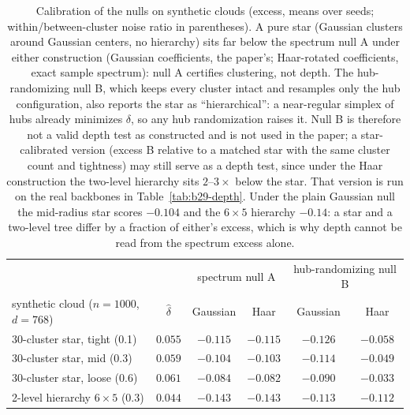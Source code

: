 \begin{table}[H]
\centering
\small
\setlength{\tabcolsep}{4pt}
\begin{tabular}{lc|cc|cc}
\toprule
& & \multicolumn{2}{c|}{spectrum null A} & \multicolumn{2}{c}{hub-randomizing null B} \\
synthetic cloud ($n{=}1000$, $d{=}768$) & $\hat\delta$ & Gaussian & Haar & Gaussian & Haar \\
\midrule
30-cluster star, tight (0.1) & $0.055$ & $-0.115$ & $-0.115$ & $-0.126$ & $-0.058$ \\
30-cluster star, mid (0.3) & $0.059$ & $-0.104$ & $-0.103$ & $-0.114$ & $-0.049$ \\
30-cluster star, loose (0.6) & $0.061$ & $-0.084$ & $-0.082$ & $-0.090$ & $-0.033$ \\
2-level hierarchy $6\times5$ (0.3) & $0.044$ & $-0.143$ & $-0.143$ & $-0.113$ & $-0.112$ \\
\bottomrule
\end{tabular}
\caption{Calibration of the nulls on synthetic clouds (excess, means over seeds; within/between-cluster noise ratio in parentheses). A pure star (Gaussian clusters around Gaussian centers, no hierarchy) sits far below the spectrum null A under either construction (Gaussian coefficients, the paper's; Haar-rotated coefficients, exact sample spectrum): null A certifies clustering, not depth. The hub-randomizing null B, which keeps every cluster intact and resamples only the hub configuration, also reports the star as ``hierarchical'': a near-regular simplex of hubs already minimizes $\delta$, so any hub randomization raises it. Null B is therefore not a valid depth test as constructed and is not used in the paper; a star-calibrated version (excess B relative to a matched star with the same cluster count and tightness) may still serve as a depth test, since under the Haar construction the two-level hierarchy sits $2$--$3\times$ below the star. That version is run on the real backbones in Table~\ref{tab:b29-depth}. Under the plain Gaussian null the mid-radius star scores $-0.104$ and the $6{\times}5$ hierarchy $-0.14$: a star and a two-level tree differ by a fraction of either's excess, which is why depth cannot be read from the spectrum excess alone.}
\label{tab:b25-star}
\end{table}

